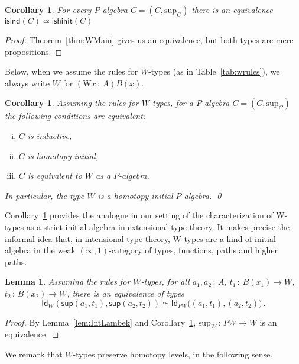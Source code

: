 \documentclass[10pt,a4paper,oneside,reqno]{amsart}
\numberwithin{equation}{section}
\theoremstyle{mythm}
\newtheorem{lemma}[theorem]{Lemma}
\newtheorem{corollary}[theorem]{Corollary}
\theoremstyle{mydef}
\theoremstyle{myrmk}
\newcommand{\co}{\,{:}\,}
\newcommand{\isalgind}{\mathsf{isind}}
\newcommand{\isalghinit}{\mathsf{ishinit}}
\newcommand{\Id}{\mathsf{Id}}
\newcommand{\W}{\mathrm{W}}
\newcommand{\wsup}{\mathsf{sup}}
\renewcommand{\sup}{\mathrm{sup}}
\begin{document}
\begin{corollary} For every $P$-algebra $C = (C, \sup_C)$ there is an equivalence $\isalgind(C) \simeq \isalghinit(C)$ 
\end{corollary}

\begin{proof} Theorem~\ref{thm:WMain} gives us an equivalence, but both types are mere propositions.
\end{proof} 

Below, when we assume the rules for $W$-types (as in Table~\ref{tab:wrules}), we always write $W$ for $(\W x \co A) B(x)$.

\begin{corollary}
\label{lem:WInitInt} Assuming the rules for $W$-types, for a $P$-algebra
$C = (C, \sup_C)$ the following conditions are
equivalent:
\begin{enumerate}[(i)]
\item $C$ is inductive,
\item $C$ is homotopy initial,
\item $C$ is equivalent to $W$ as a $P$-algebra.
\end{enumerate}
In particular, the type $W$ is a homotopy-initial $P$-algebra. \qed
\end{corollary}


Corollary~\ref{lem:WInitInt} provides the analogue in our setting of the characterization of W-types as a strict initial algebra in extensional type theory. It makes precise the informal idea that, in intensional type theory, W-types are a kind of initial algebra in the weak $(\infty, 1)$-category of types, functions, paths and higher paths.  

\begin{lemma} \label{lem:suppath}
Assuming the rules for $W$-types, 
for all $a_1,a_2 \co A$, $t_1 \co B(x_1) \to W$, $t_2 \co B(x_2) \to W$, there is an equivalence of types
\[ 
\Id_W( \wsup(a_1,t_1),  \wsup(a_2,t_2)  ) \simeq  \Id_{PW} \big( (a_1,t_1), (a_2,t_2) \big) \, . 
\]
\end{lemma}

\begin{proof}
By Lemma~\ref{lem:IntLambek} and Corollary~\ref{lem:WInitInt}, $\sup_W \co PW \to W$ is an equivalence.
\end{proof}





We  remark that $W$-types  preserve homotopy levels, in the following sense.
\end{document}
